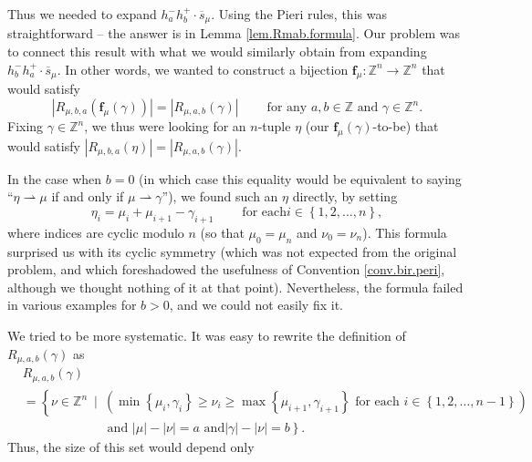 \documentclass[numbers=enddot,12pt,final,onecolumn,notitlepage]{scrartcl}%
\theoremstyle{definition}
\begin{document}
Thus we needed to expand $h_{a}^{-}h_{b}^{+}\cdot\overline{s}_{\mu}$. Using
the Pieri rules, this was straightforward -- the answer is in Lemma
\ref{lem.Rmab.formula}. Our problem was to connect this result with what we
would similarly obtain from expanding $h_{b}^{-}h_{a}^{+}\cdot\overline
{s}_{\mu}$. In other words, we wanted to construct a bijection $\mathbf{f}%
_{\mu}:\mathbb{Z}^{n}\rightarrow\mathbb{Z}^{n}$ that would satisfy%
\[
\left\vert R_{\mu,b,a}\left(  \mathbf{f}_{\mu}\left(  \gamma\right)  \right)
\right\vert =\left\vert R_{\mu,a,b}\left(  \gamma\right)  \right\vert
\ \ \ \ \ \ \ \ \ \ \text{for any }a,b\in\mathbb{Z}\text{ and }\gamma
\in\mathbb{Z}^{n}.
\]
Fixing $\gamma\in\mathbb{Z}^{n}$, we thus were looking for an $n$-tuple $\eta$
(our $\mathbf{f}_{\mu}\left(  \gamma\right)  $-to-be) that would satisfy
$\left\vert R_{\mu,b,a}\left(  \eta\right)  \right\vert =\left\vert
R_{\mu,a,b}\left(  \gamma\right)  \right\vert $.

In the case when $b=0$ (in which case this equality would be equivalent to
saying \textquotedblleft$\eta\rightharpoonup\mu$ if and only if $\mu
\rightharpoonup\gamma$\textquotedblright), we found such an $\eta$ directly,
by setting%
\[
\eta_{i}=\mu_{i}+\mu_{i+1}-\gamma_{i+1}\ \ \ \ \ \ \ \ \ \ \text{for each
}i\in\left\{  1,2,\ldots,n\right\}  ,
\]
where indices are cyclic modulo $n$ (so that $\mu_{0}=\mu_{n}$ and $\nu
_{0}=\nu_{n}$). This formula surprised us with its cyclic symmetry (which was
not expected from the original problem, and which foreshadowed the usefulness
of Convention \ref{conv.bir.peri}, although we thought nothing of it at that
point). Nevertheless, the formula failed in various examples for $b>0$, and we
could not easily fix it.

We tried to be more systematic. It was easy to rewrite the definition of
$R_{\mu,a,b}\left(  \gamma\right)  $ as%
\begin{align*}
&  R_{\mu,a,b}\left(  \gamma\right) \\
&  =\left\{  \nu\in\mathbb{Z}^{n}\ \mid\ \left(  \min\left\{  \mu_{i}%
,\gamma_{i}\right\}  \geq\nu_{i}\geq\max\left\{  \mu_{i+1},\gamma
_{i+1}\right\}  \text{ for each }i\in\left\{  1,2,\ldots,n-1\right\}  \right)
\right. \\
&  \ \ \ \ \ \ \ \ \ \ \ \ \ \ \ \ \ \ \ \ \ \ \ \ \ \ \ \ \ \ \left.
\text{and }\left\vert \mu\right\vert -\left\vert \nu\right\vert =a\text{ and
}\left\vert \gamma\right\vert -\left\vert \nu\right\vert =b\right\}  .
\end{align*}
Thus, the size of this set would depend only
\end{document}

